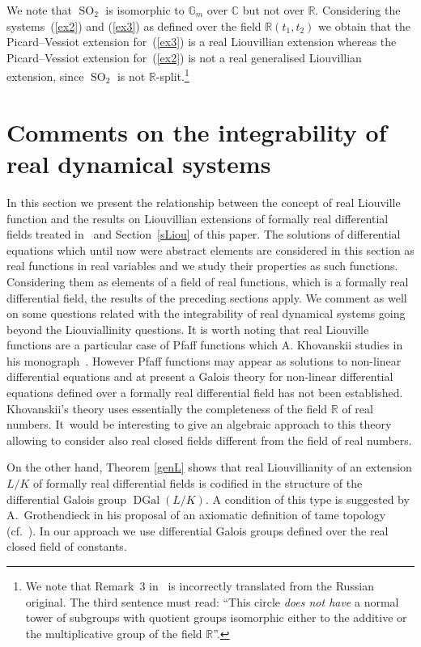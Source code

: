 \documentclass[10pt,a4paper]{amsart}
\numberwithin{equation}{section}
\newcommand{\G}{\mathbb{G}}
\newcommand{\R}{\mathbb{R}}
\newcommand{\C}{\mathbb{C}}
\def \DGal{\operatorname{DGal}}
\def \SO{\operatorname{SO}}
\begin{document}
\begin{Example}
We note that $\SO_2$ is isomorphic to $\G_m$ over $\C$ but not over $\R$. Considering the systems~(\ref{ex2}) and (\ref{ex3}) as defined over the field $\R(t_1,t_2)$ we obtain that the Picard--Vessiot extension for~(\ref{ex3}) is a real Liouvillian extension whereas the Picard--Vessiot extension for~(\ref{ex2}) is not a real gene\-ralised Liouvillian extension, since $\SO_2$ is not $\R$-split.\footnote{We note that Remark~3 in~\cite{GK} is incorrectly translated from the Russian original. The third sentence must read: ``This circle {\it does not have} a normal tower of subgroups with quotient groups isomorphic either to the additive or the multiplicative group of the field $\R$''.}
\end{Example}
\section{Comments on the integrability of real dynamical systems}

In this section we present the relationship between the concept of real Liouville function and the results on Liouvillian extensions of formally real differential fields treated in~\cite {CH} and Section~\ref{sLiou} of this paper. The solutions of differential equations which until now were abstract elements are considered in this section as real functions in real variables and we study their properties as such functions. Considering them as elements of a field of real functions, which is a formally real differential field, the results of the preceding sections apply. We comment as well on some questions related with the integrability of real dynamical systems going beyond the Liouviallinity questions. It is worth noting that real Liouville functions are a particular case of Pfaff functions which A. Khovanskii studies in his monograph~\cite{Kh}. However Pfaff functions may appear as solutions to non-linear differential equations and at present a Galois theory for non-linear differential equations defined over a formally real differential field has not been established. Khovanskii's theory uses essentially the completeness of the field $\R$ of real numbers. It~would be interesting to give an algebraic approach to this theory allowing to consider also real closed fields different from the field of real numbers.

{\sloppy
On the other hand, Theorem \ref{genL} shows that real Liouvillianity of an extension $L/K$ of formally real differential fields is codified in the structure of the differential Galois group $\DGal(L/K)$. A condition of this type is suggested by A.~Grothendieck in his proposal of an axiomatic definition of tame topology (cf.~\cite[p.~272]{GGA}). In our approach we use differential Galois groups defined over the real closed field of constants.

}
\end{document}
